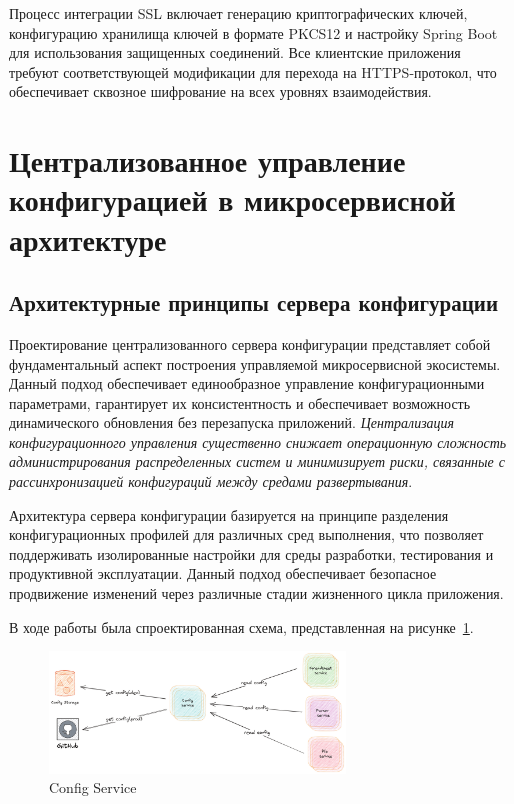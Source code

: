 Процесс интеграции SSL включает генерацию криптографических ключей, конфигурацию хранилища ключей в формате PKCS12 и настройку Spring Boot для использования защищенных соединений. Все клиентские приложения требуют соответствующей модификации для перехода на HTTPS-протокол, что обеспечивает сквозное шифрование на всех уровнях взаимодействия.


\section{Централизованное управление конфигурацией в микросервисной архитектуре}

\subsection{Архитектурные принципы сервера конфигурации}

Проектирование централизованного сервера конфигурации представляет собой фундаментальный аспект построения управляемой микросервисной экосистемы. Данный подход обеспечивает единообразное управление конфигурационными параметрами, гарантирует их консистентность и обеспечивает возможность динамического обновления без перезапуска приложений. \textit{Централизация конфигурационного управления существенно снижает операционную сложность администрирования распределенных систем и минимизирует риски, связанные с рассинхронизацией конфигураций между средами развертывания}.

Архитектура сервера конфигурации базируется на принципе разделения конфигурационных профилей для различных сред выполнения, что позволяет поддерживать изолированные настройки для среды разработки, тестирования и продуктивной эксплуатации. Данный подход обеспечивает безопасное продвижение изменений через различные стадии жизненного цикла приложения.

В ходе работы была спроектированная схема, представленная на рисунке~\ref{fig:cfg_prj}.

\begin{figure}[htbp]
    \centering
    \includegraphics[width=0.7\textwidth]{Dissertation/images/cfg_project}
    \caption{Config Service}
    \label{fig:cfg_prj}
\end{figure}

